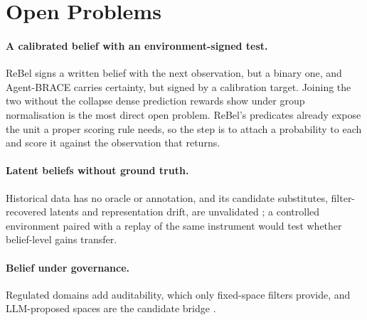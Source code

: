 \section{Open Problems}
\label{sec:challenges}

\paragraph{A calibrated belief with an environment-signed test.}
ReBel signs a written belief with the next observation, but a binary one, and Agent-BRACE carries certainty, but signed by a calibration target. Joining the two without the collapse dense prediction rewards show under group normalisation is the most direct open problem. ReBel's predicates already expose the unit a proper scoring rule needs, so the step is to attach a probability to each and score it against the observation that returns.

\paragraph{Latent beliefs without ground truth.}
Historical data has no oracle or annotation, and its candidate substitutes, filter-recovered latents and representation drift, are unvalidated \citep{dixon2026belief,xue2026representation}; a controlled environment paired with a replay of the same instrument would test whether belief-level gains transfer.

\paragraph{Belief under governance.}
Regulated domains add auditability, which only fixed-space filters provide, and LLM-proposed spaces are the candidate bridge \citep{six2026learning,soru2026semantic,chen2026beliefcalibrated,dixon2026model}.
